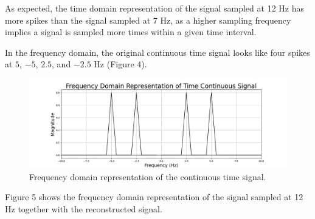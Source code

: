\documentclass{article}
\begin{document}

    
    

As expected, the time domain representation of the signal sampled at 12 Hz has more spikes than the signal sampled at 7 Hz, as a higher sampling frequency implies a signal is sampled more times within a given time interval.

In the frequency domain, the original continuous time signal looks like four spikes at $5$, $-5$, $2.5$, and $-2.5$ Hz (Figure 4).
\begin{figure}[H]
    \includegraphics[width=\linewidth]{images/freqdom_timecont_black.png}
    \caption{Frequency domain representation of the continuous time signal.}
    \label{fig:enter-label}
\end{figure}

Figure 5 shows the frequency domain representation of the signal sampled at 12 Hz together with the reconstructed signal. 
\end{document}
